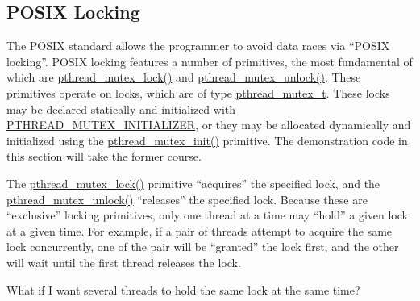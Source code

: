 \subsection{POSIX Locking}
\label{sec:toolsoftrade:POSIX Locking}

The POSIX standard allows the programmer to avoid data races via
``POSIX locking''.
POSIX locking features a number of primitives, the most fundamental
of which are \url{pthread_mutex_lock()} and \url{pthread_mutex_unlock()}.
These primitives operate on locks, which are of type \url{pthread_mutex_t}.
These locks may be declared statically and initialized with
\url{PTHREAD_MUTEX_INITIALIZER}, or they may be allocated dynamically
and initialized using the \url{pthread_mutex_init()} primitive.
The demonstration code in this section will take the former course.

The \url{pthread_mutex_lock()} primitive ``acquires'' the specified lock,
and the \url{pthread_mutex_unlock()} ``releases'' the specified lock.
Because these are ``exclusive'' locking primitives,
only one thread at a time may ``hold'' a given lock at a given time.
For example, if a pair of threads attempt to acquire the same lock
concurrently, one of the pair will be ``granted'' the lock first, and
the other will wait until the first thread releases the lock.

\QuickQuiz{}
	What if I want several threads to hold the same lock at the
	same time?
 \QuickQuizEnd

